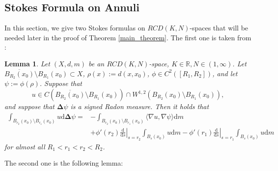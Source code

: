 \documentclass{article}
\newtheorem{lemma}[theorem]{Lemma}
\theoremstyle{remark}
\numberwithin{equation}{section}
\theoremstyle{definition}
\begin{document}
\subsection{Stokes Formula on Annuli}\label{subsection_Stokes_formula}
    In this section, we give two Stokes formulas on $RCD(K,N)$-spaces that will be needed later in the proof of Theorem \ref{main_theorem}. The first one is taken from \cite[Remark 5.2]{Chan-Zhang-Zhu_2021}:
    \begin{lemma}\label{Stokes_1}
    	Let $(X,d,m)$ be an $RCD(K,N)$-space, $K \in \mathbb{R}, N \in (1,\infty)$. Let $\overline{B_{R_{2}}(x_{0})} \setminus B_{R_{1}}(x_{0}) \subset X$, $\rho(x) := d(x,x_{0})$, $\phi \in C^{2}([R_{1},R_{2}])$, and let $\psi := \phi(\rho)$. Suppose that
    	\begin{equation}
    		u \in C(\overline{B_{R_{2}}(x_{0})} \setminus B_{R_{1}}(x_{0})) \cap W^{1,2}(B_{R_{2}}(x_{0}) \setminus B_{R_{1}}(x_{0})),
    	\end{equation}
        and suppose that $\mathbf{\Delta} \psi$ is a signed Radon measure. Then it holds that
        \begin{equation}
        	\begin{split}
        		\int_{B_{r_{2}}(x_{0}) \setminus B_{r_{1}}(x_{0})} u \mathrm{d} \mathbf{\Delta} \psi = & - \int_{B_{r_{2}}(x_{0}) \setminus B_{r_{1}}(x_{0})} \langle \nabla u, \nabla \psi \rangle \mathrm{d}m\\
        		& + {\phi}'(r_{2}) \left. \frac{\mathrm{d}}{\mathrm{d}s} \right|_{s = r_{2}} \int_{B_{s}(x_{0})} u \mathrm{d}m - {\phi}'(r_{1}) \left. \frac{\mathrm{d}}{\mathrm{d}s} \right|_{s = r_{1}} \int_{B_{s}(x_{0})} u \mathrm{d}m
        	\end{split}
        \end{equation}
        for almost all $R_{1} < r_{1} < r_{2} < R_{2}$.
    \end{lemma}
    The second one is the following lemma:
\end{document}
